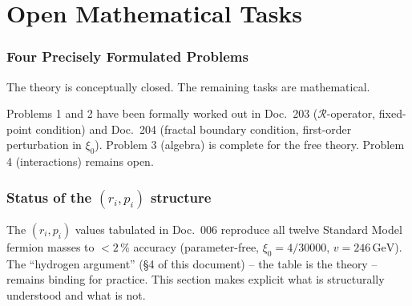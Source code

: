 \part{Open Mathematical Tasks}

\section{Four Precisely Formulated Problems}

The theory is conceptually closed. The remaining tasks are mathematical.

Problems 1 and 2 have been formally worked out in Doc.~203
($\mathcal{R}$-operator, fixed-point condition) and Doc.~204
(fractal boundary condition, first-order perturbation in $\xi_0$).
Problem 3 (algebra) is complete for the free theory.
Problem 4 (interactions) remains open.

\begin{center}
{\setlength{\hfuzz}{5pt}\scriptsize
{}}
\end{center}

\section{Status of the \texorpdfstring{$(r_i, p_i)$}{(r_i, p_i)} structure}
\label{sec:status-r-p}

The $(r_i, p_i)$ values tabulated in Doc.~006 reproduce all twelve
Standard Model fermion masses to $<2\,\%$ accuracy (parameter-free,
$\xi_0 = 4/30000$, $v = 246\,\text{GeV}$). The \enquote{hydrogen
argument} (§4 of this document) -- the table is the theory --
remains binding for practice. This section makes explicit what is
structurally understood and what is not.


